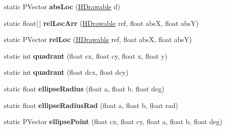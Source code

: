 \begin{DoxyCompactItemize}
\item 
\hypertarget{classhype_1_1util_1_1_h_math_aee57098084f0f50e331137118f8117de}{static P\-Vector {\bfseries abs\-Loc} (\hyperlink{classhype_1_1drawable_1_1_h_drawable}{H\-Drawable} d)}\label{classhype_1_1util_1_1_h_math_aee57098084f0f50e331137118f8117de}

\item 
\hypertarget{classhype_1_1util_1_1_h_math_a6b559893c3fc34d449fb74569d69f102}{static float\mbox{[}$\,$\mbox{]} {\bfseries rel\-Loc\-Arr} (\hyperlink{classhype_1_1drawable_1_1_h_drawable}{H\-Drawable} ref, float abs\-X, float abs\-Y)}\label{classhype_1_1util_1_1_h_math_a6b559893c3fc34d449fb74569d69f102}

\item 
\hypertarget{classhype_1_1util_1_1_h_math_aadfd0957687dce7e680a8ffab0677bcf}{static P\-Vector {\bfseries rel\-Loc} (\hyperlink{classhype_1_1drawable_1_1_h_drawable}{H\-Drawable} ref, float abs\-X, float abs\-Y)}\label{classhype_1_1util_1_1_h_math_aadfd0957687dce7e680a8ffab0677bcf}

\item 
\hypertarget{classhype_1_1util_1_1_h_math_a12b9d0f3cfec809876d8381dd59f4bfa}{static int {\bfseries quadrant} (float cx, float cy, float x, float y)}\label{classhype_1_1util_1_1_h_math_a12b9d0f3cfec809876d8381dd59f4bfa}

\item 
\hypertarget{classhype_1_1util_1_1_h_math_a77d4c651da50c90d3b210082f3d7160a}{static int {\bfseries quadrant} (float dcx, float dcy)}\label{classhype_1_1util_1_1_h_math_a77d4c651da50c90d3b210082f3d7160a}

\item 
\hypertarget{classhype_1_1util_1_1_h_math_acd2400df49f165585c7c5069032d3c30}{static float {\bfseries ellipse\-Radius} (float a, float b, float deg)}\label{classhype_1_1util_1_1_h_math_acd2400df49f165585c7c5069032d3c30}

\item 
\hypertarget{classhype_1_1util_1_1_h_math_aeba1842b15edd56fa8cc628098cfb592}{static float {\bfseries ellipse\-Radius\-Rad} (float a, float b, float rad)}\label{classhype_1_1util_1_1_h_math_aeba1842b15edd56fa8cc628098cfb592}

\item 
\hypertarget{classhype_1_1util_1_1_h_math_a57230ddf5b0c28c1868a64904f3f19f7}{static P\-Vector {\bfseries ellipse\-Point} (float cx, float cy, float a, float b, float deg)}\label{classhype_1_1util_1_1_h_math_a57230ddf5b0c28c1868a64904f3f19f7}


\end{DoxyCompactItemize}
